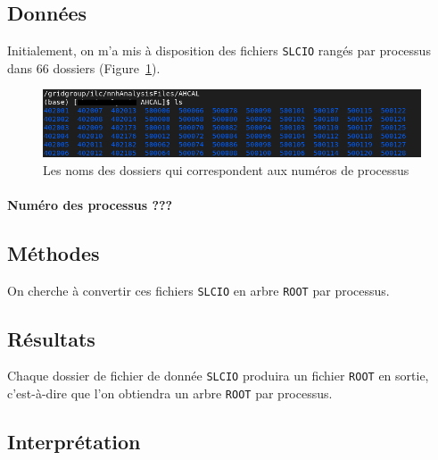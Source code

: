 \documentclass[10pt,a4paper]{report}
\newcommand{\cad}{c'est-à-dire\xspace}
\newcommand{\ROOT}{\texttt{ROOT}\xspace}
\newcommand{\SLCIO}{\texttt{SLCIO}\xspace}
\begin{document}
\subsection{Données}
Initialement, on m'a mis à disposition des fichiers \SLCIO rangés par processus dans 66 dossiers (Figure~\ref{listeProcessus}).

\begin{figure}[h!]
	\includegraphics[width= \textwidth]{img/listeProcessus.png} 
	\caption{Les noms des dossiers qui correspondent aux numéros de processus}
	\label{listeProcessus}
	
\end{figure}

\paragraph{Numéro des processus ???}


\subsection{Méthodes}

On cherche à convertir ces fichiers \SLCIO en arbre \ROOT par processus.

\subsection{Résultats}

Chaque dossier de fichier de donnée \SLCIO produira un fichier \ROOT en sortie, \cad que l'on obtiendra un arbre \ROOT par processus.


\subsection{Interprétation}
\end{document}
